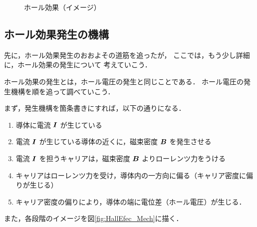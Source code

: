                         \begin{figure}[htbp]
                            \begin{center}
                                \caption{ホール効果（イメージ）}
                                \label{fig:HallEfect1}
                            \end{center}
                        \end{figure}

        \subsection{ホール効果発生の機構}
            先に，ホール効果発生のおおよその道筋を追ったが，
            ここでは，もう少し詳細に，ホール効果の発生について
            考えていこう．

            ホール効果の発生とは，ホール電圧の発生と同じことである．
            ホール電圧の発生機構を順を追って調べていこう．

            まず，発生機構を箇条書きにすれば，以下の通りになる．

                \begin{enumerate}
                    \item 導体に電流 $\boldsymbol{I}$ が生じている
                    \item 電流 $\boldsymbol{I}$ が生じている導体の近くに，磁束密度 $\boldsymbol{B}$ を発生させる
                    \item 電流 $\boldsymbol{I}$ を担うキャリアは，磁束密度 $\boldsymbol{B}$ よりローレンツ力をうける
                    \item キャリアはローレンツ力を受け，導体内の一方向に偏る（キャリア密度に偏りが生じる）
                    \item キャリア密度の偏りにより，導体の端に電位差（ホール電圧）が生じる．
                \end{enumerate}

            また，各段階のイメージを図\ref{fig:HallEfec_Mech}に描く．

